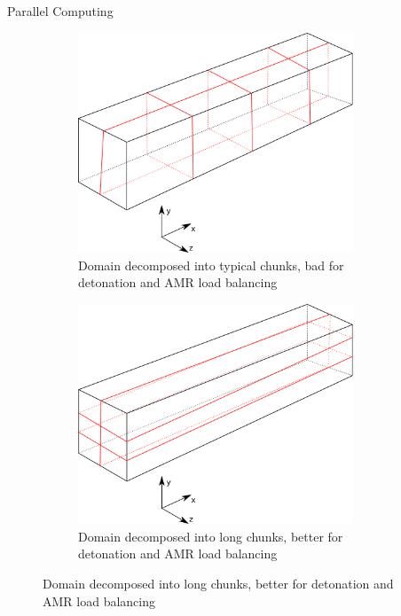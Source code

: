 \begin{frame}[allowframebreaks]{Parallel Computing}
\begin{figure}[p]
    \centering
    \begin{subfigure}[]{0.45\textwidth}
        \centering
        \includegraphics[width=0.9\textwidth]{../figs/parallel_short.png}
        \caption{Domain decomposed into typical chunks, bad for detonation and AMR load balancing}
    \end{subfigure}%
    \begin{subfigure}[]{0.45\textwidth}
        \centering
        \includegraphics[width=0.9\textwidth]{../figs/parallel_long.png}
        \caption{Domain decomposed into long chunks, better for detonation and AMR load balancing}
    \end{subfigure}
\end{figure}%
\end{frame}

